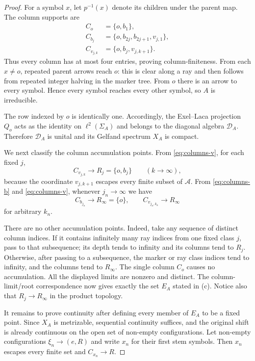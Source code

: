 \documentclass[11pt]{article}
\newcommand{\EA}{E_A}
\newcommand{\XA}{X_A}
\newcommand{\SA}{\Sigma_A}
\begin{document}
\begin{proof}
For a symbol $x$, let $p^{-1}(x)$ denote its children under the parent map.
The column supports are
\begin{align}
 C_o&=\{o,b_1\},\label{eq:columns-o}\\
 C_{b_j}&=\{o,b_{2j},b_{2j+1},v_{j,1}\},\label{eq:columns-b}\\
 C_{v_{j,k}}&=\{o,b_j,v_{j,k+1}\}.\label{eq:columns-v}
\end{align}
Thus every column has at most four entries, proving column-finiteness.
From each $x\ne o$, repeated parent arrows reach $o$: this is clear along a
ray and then follows from repeated integer halving in the marker tree.  From
$o$ there is an arrow to every symbol.  Hence every symbol reaches every other
symbol, so $A$ is irreducible.

The row indexed by $o$ is identically one.  Accordingly, the Exel--Laca
projection $Q_o$ acts as the identity on $\ell^2(\SA)$ and belongs to the
diagonal algebra $\mathcal D_A$.  Therefore $\mathcal D_A$ is unital and its
Gelfand spectrum $\XA$ is compact.

We next classify the column accumulation points.  From
\eqref{eq:columns-v}, for each fixed $j$,
\[
 C_{v_{j,k}}\longrightarrow R_j=\{o,b_j\}
 \qquad(k\to\infty),
\]
because the coordinate $v_{j,k+1}$ escapes every finite subset of
$\mathcal A$.  From \eqref{eq:columns-b} and \eqref{eq:columns-v}, whenever
$j_n\to\infty$ we have
\[
 C_{b_{j_n}}\longrightarrow R_\infty=\{o\},\qquad
 C_{v_{j_n,k_n}}\longrightarrow R_\infty
\]
for arbitrary $k_n$.

There are no other accumulation points.  Indeed, take any sequence of
distinct column indices.  If it contains infinitely many ray indices from one
fixed class $j$, pass to that subsequence; its depth tends to infinity and its
columns tend to $R_j$.  Otherwise, after passing to a subsequence, the marker
or ray class indices tend to infinity, and the columns tend to $R_\infty$.
The single column $C_o$ causes no accumulation.  All the displayed limits are
nonzero and distinct.  The column-limit/root correspondence now gives exactly
the set $\EA$ stated in (c).  Notice also that $R_j\to R_\infty$ in the product
topology.

It remains to prove continuity after defining every member of $\EA$ to be a
fixed point.  Since $\XA$ is metrizable, sequential continuity suffices, and
the original shift is already continuous on the open set of non-empty
configurations.  Let non-empty configurations $\xi_n\to(e,R)$ and write
$x_n$ for their first stem symbols.  Then $x_n$ escapes every finite set and
$C_{x_n}\to R$.


\end{proof}
\end{document}
